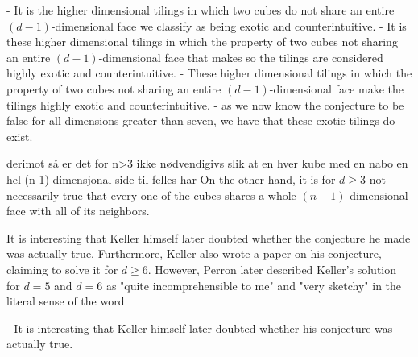 - It is the higher dimensional tilings in which two cubes do not share an entire $(d-1)$-dimensional face we classify as being exotic and counterintuitive.
- It is these higher dimensional tilings in which the property of two cubes not sharing an entire $(d-1)$-dimensional face that makes so the tilings are considered highly exotic and counterintuitive. 
- These higher dimensional tilings in which the property of two cubes not sharing an entire $(d-1)$-dimensional face make the tilings highly exotic and counterintuitive. 
- as we now know the conjecture to be false for all dimensions greater than seven, we have that these exotic tilings do exist. 




derimot så er det for n>3 ikke nødvendigivs slik at en hver kube med en nabo en hel (n-1) dimensjonal side til felles har 
On the other hand, it is for $d\geq 3$ not necessarily true that every one of the cubes shares a whole $(n-1)$-dimensional face with all of its neighbors.

It is interesting that Keller himself later doubted whether the conjecture he made was actually true. Furthermore, Keller also wrote a paper on his conjecture, claiming to solve it for $d\geq 6$. However, Perron later described Keller's solution for $d=5$ and $d=6$ as "quite incomprehensible to me" and "very sketchy" in the literal sense of the word \cite{perronUeberLueckenloseAusfuellung1940}

- It is interesting that Keller himself later doubted whether his conjecture was actually true.